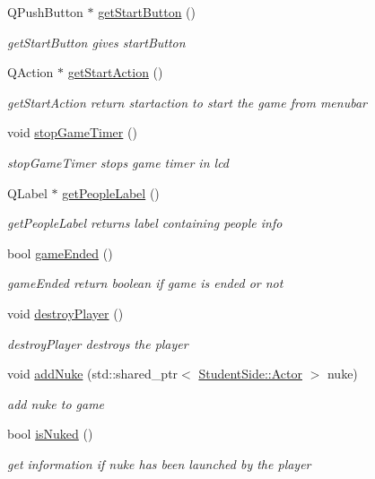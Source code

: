 \begin{DoxyCompactItemize}
Q\-Push\-Button $\ast$ \hyperlink{class_student_side_1_1_mainwindow_a0892eab493aace8eee0358c3d8e88d22}{get\-Start\-Button} ()
\begin{DoxyCompactList}\small\item\em get\-Start\-Button gives start\-Button \end{DoxyCompactList}\item 
Q\-Action $\ast$ \hyperlink{class_student_side_1_1_mainwindow_ae6bc2b06ca8ab22d7e5b5fbc10fbfe3b}{get\-Start\-Action} ()
\begin{DoxyCompactList}\small\item\em get\-Start\-Action return startaction to start the game from menubar \end{DoxyCompactList}\item 
void \hyperlink{class_student_side_1_1_mainwindow_acaa53f081e50381150eae32085f2aeea}{stop\-Game\-Timer} ()
\begin{DoxyCompactList}\small\item\em stop\-Game\-Timer stops game timer in lcd \end{DoxyCompactList}\item 
Q\-Label $\ast$ \hyperlink{class_student_side_1_1_mainwindow_a76f2312aed3a925d44111963a054512a}{get\-People\-Label} ()
\begin{DoxyCompactList}\small\item\em get\-People\-Label returns label containing people info \end{DoxyCompactList}\item 
bool \hyperlink{class_student_side_1_1_mainwindow_a413ff2fac6648addbd19f8a06a1305c7}{game\-Ended} ()
\begin{DoxyCompactList}\small\item\em game\-Ended return boolean if game is ended or not \end{DoxyCompactList}\item 
void \hyperlink{class_student_side_1_1_mainwindow_ace501f039bcececc0c7e891664bbaa50}{destroy\-Player} ()
\begin{DoxyCompactList}\small\item\em destroy\-Player destroys the player \end{DoxyCompactList}\item 
void \hyperlink{class_student_side_1_1_mainwindow_a66eadfc3c6e2f3e893b2142449b00f49}{add\-Nuke} (std\-::shared\-\_\-ptr$<$ \hyperlink{class_student_side_1_1_actor}{Student\-Side\-::\-Actor} $>$ nuke)
\begin{DoxyCompactList}\small\item\em add nuke to game \end{DoxyCompactList}\item 
bool \hyperlink{class_student_side_1_1_mainwindow_a9d393368717ac9f7cbaaae048b355e65}{is\-Nuked} ()
\begin{DoxyCompactList}\small\item\em get information if nuke has been launched by the player \end{DoxyCompactList}\end{DoxyCompactItemize}
